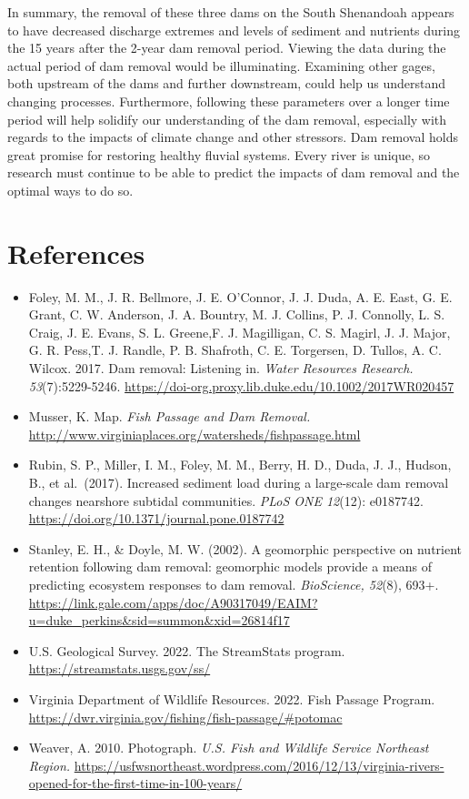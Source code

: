 \documentclass[
  12pt,
]{article}
\begin{document}
In summary, the removal of these three dams on the South Shenandoah
appears to have decreased discharge extremes and levels of sediment and
nutrients during the 15 years after the 2-year dam removal period.
Viewing the data during the actual period of dam removal would be
illuminating. Examining other gages, both upstream of the dams and
further downstream, could help us understand changing processes.
Furthermore, following these parameters over a longer time period will
help solidify our understanding of the dam removal, especially with
regards to the impacts of climate change and other stressors. Dam
removal holds great promise for restoring healthy fluvial systems. Every
river is unique, so research must continue to be able to predict the
impacts of dam removal and the optimal ways to do so.

\newpage

\hypertarget{references}{%
\section{References}\label{references}}

\begin{itemize}
\item
  Foley, M. M., J. R. Bellmore, J. E. O'Connor, J. J. Duda, A. E. East,
  G. E. Grant, C. W. Anderson, J. A. Bountry, M. J. Collins, P. J.
  Connolly, L. S. Craig, J. E. Evans, S. L. Greene,F. J. Magilligan, C.
  S. Magirl, J. J. Major, G. R. Pess,T. J. Randle, P. B. Shafroth, C. E.
  Torgersen, D. Tullos, A. C. Wilcox. 2017. Dam removal: Listening in.
  \emph{Water Resources Research. 53}(7):5229-5246.
  \url{https://doi-org.proxy.lib.duke.edu/10.1002/2017WR020457}
\item
  Musser, K. Map. \emph{Fish Passage and Dam Removal.}
  \url{http://www.virginiaplaces.org/watersheds/fishpassage.html}
\item
  Rubin, S. P., Miller, I. M., Foley, M. M., Berry, H. D., Duda, J. J.,
  Hudson, B., et al.~(2017). Increased sediment load during a
  large-scale dam removal changes nearshore subtidal communities.
  \emph{PLoS ONE 12}(12): e0187742.
  \url{https://doi.org/10.1371/journal.pone.0187742}
\item
  Stanley, E. H., \& Doyle, M. W. (2002). A geomorphic perspective on
  nutrient retention following dam removal: geomorphic models provide a
  means of predicting ecosystem responses to dam removal.
  \emph{BioScience, 52}(8), 693+.
  \url{https://link.gale.com/apps/doc/A90317049/EAIM?u=duke_perkins\&sid=summon\&xid=26814f17}
\item
  U.S. Geological Survey. 2022. The StreamStats program.
  \url{https://streamstats.usgs.gov/ss/}
\item
  Virginia Department of Wildlife Resources. 2022. Fish Passage Program.
  \url{https://dwr.virginia.gov/fishing/fish-passage/\#potomac}
\item
  Weaver, A. 2010. Photograph. \emph{U.S. Fish and Wildlife Service
  Northeast Region.}
  \url{https://usfwsnortheast.wordpress.com/2016/12/13/virginia-rivers-opened-for-the-first-time-in-100-years/}
\end{itemize}
\end{document}
